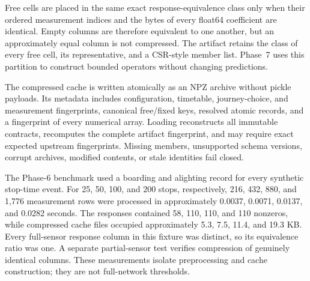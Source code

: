 Free cells are placed in the same exact response-equivalence class only when
their ordered measurement indices and the bytes of every float64 coefficient
are identical.  Empty columns are therefore equivalent to one another, but an
approximately equal column is not compressed.  The artifact retains the class
of every free cell, its representative, and a CSR-style member list.  Phase~7
uses this partition to construct bounded operators without changing
predictions.

The compressed cache is written atomically as an NPZ archive without pickle
payloads.  Its metadata includes configuration, timetable, journey-choice, and
measurement fingerprints, canonical free/fixed keys, resolved atomic records,
and a fingerprint of every numerical array.  Loading reconstructs all immutable
contracts, recomputes the complete artifact fingerprint, and may require exact
expected upstream fingerprints.  Missing members, unsupported schema versions,
corrupt archives, modified contents, or stale identities fail closed.

The Phase-6 benchmark used a boarding and alighting record for every synthetic
stop-time event.  For 25, 50, 100, and 200 stops, respectively, 216, 432, 880,
and 1,776 measurement rows were processed in approximately 0.0037, 0.0071,
0.0137, and 0.0282 seconds.  The responses contained 58, 110, 110, and 110
nonzeros, while compressed cache files occupied approximately 5.3, 7.5, 11.4,
and 19.3 KB.  Every full-sensor response column in this fixture was distinct,
so its equivalence ratio was one.  A separate partial-sensor test verifies
compression of genuinely identical columns.  These measurements isolate
preprocessing and cache construction; they are not full-network thresholds.

